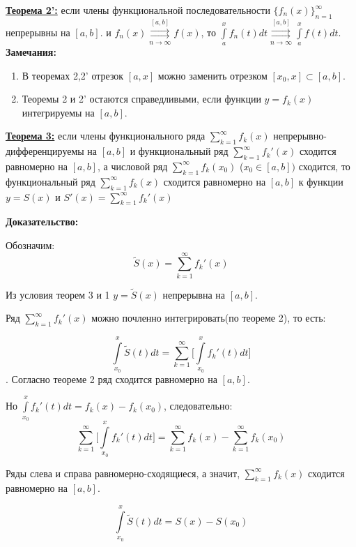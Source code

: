 \documentclass[a4paper,12pt]{article} %
\begin{document}
\underline{\textbf{Теорема 2':}} если члены функциональной последовательности  $\{f_n(x)\}_{n=1}^\infty$ непрерывны на $[a,b]$. и $f_n(x) \overset{[a,b]}{\underset{n \rightarrow \infty}{\rightrightarrows}} f(x)$, то $\int\limits_a^x f_n(t)dt \overset{[a,b]}{\underset{n \rightarrow \infty}{\rightrightarrows}} \int\limits_a^x f(t)dt$.\\

\textbf{Замечания:}
\begin{enumerate}
    \item В теоремах 2,2' отрезок $[a,x]$ можно заменить отрезком $[x_0,x] \subset [a,b].$
    
    \item Теоремы 2 и 2' остаются справедливыми, если функции $y=f_k(x)$ интегрируемы на $[a,b]$.
\end{enumerate}

\underline{\textbf{Теорема 3:}} если члены функционального ряда $\sum\limits_{k = 1}^{\infty}  f_k(x)$   непрерывно-дифференцируемы  на $[a,b]$ и функциональный ряд $\sum\limits_{k = 1}^{\infty}  f_k'(x)$ сходится равномерно на $[a,b]$, а числовой ряд $\sum\limits_{k = 1}^{\infty}  f_k(x_0)$ ($x_0 \in [a,b])$ сходится, то функциональный ряд $\sum\limits_{k = 1}^{\infty}  f_k(x)$ сходится равномерно на $[a,b]$ к функции $y = S(x)$ и $S'(x) = \sum\limits_{k = 1}^{\infty}  f_k'(x)$

\textbf{Доказательство:}

Обозначим: $$\widetilde{S}(x)= \sum\limits_{k = 1}^{\infty}  f_k'(x)$$

Из условия теорем 3 и 1 $y = \widetilde{S}(x)$ непрерывна на $[a,b]$.

Ряд $\sum\limits_{k = 1}^{\infty}  f_k'(x)$ можно почленно интегрировать(по теореме 2), то есть:

$$\int\limits_{x_0}^x \widetilde{S}(t)dt = \sum\limits_{k = 1}^{\infty}  \big[\int\limits_{x_0}^{x}f_k'(t)dt\big]$$. \newline
Согласно теореме 2 ряд сходится равномерно на $[a,b]$. 

Но $\int\limits_{x_0}^{x}f_k'(t)dt = f_k(x)-f_k(x_0)$, следовательно: $$\sum\limits_{k = 1}^{\infty}  \big[\int\limits_{x_0}^{x}f_k'(t)dt\big] = \sum\limits_{k=1}^\infty f_k(x)-\sum\limits_{k=1}^\infty f_k(x_0)$$

Ряды слева и справа равномерно-сходящиеся, а значит, $\sum\limits_{k=1}^\infty f_k(x)$ сходится равномерно на $[a,b]$.

$$\int\limits_{x_0}^x \widetilde{S}(t)dt = S(x)-S(x_0)$$
\end{document}
